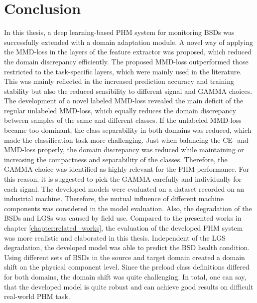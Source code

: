 \chapter{Conclusion}\label{chapter:conclusion}

In this thesis, a deep learning-based PHM system for monitoring BSDs was successfully extended with a domain adaptation module. A novel way of applying the MMD-loss in the layers of the feature extractor was proposed, which reduced the domain discrepancy efficiently. The proposed MMD-loss outperformed those restricted to the task-specific layers, which were mainly used in the literature. This was mainly reflected in the increased prediction accuracy and training stability but also the reduced sensibility to different signal and GAMMA choices. The development of a novel labeled MMD-loss revealed the main deficit of the regular unlabeled MMD-loss, which equally reduces the domain discrepancy between samples of the same and different classes. If the unlabeled MMD-loss became too dominant, the class separability in both domains was reduced, which made the classification task more challenging. Just when balancing the CE- and MMD-loss properly, the domain discrepancy was reduced while maintaining or increasing the compactness and separability of the classes. Therefore, the GAMMA choice was identified as highly relevant for the PHM performance. For this reason, it is suggested to pick the GAMMA carefully and individually for each signal. The developed models were evaluated on a dataset recorded on an industrial machine. Therefore, the mutual influence of different machine components was considered in the model evaluation. Also, the degradation of the BSDs and LGSs was caused by field use. Compared to the presented works in chapter \ref{chapter:related_works}, the evaluation of the developed PHM system was more realistic and elaborated in this thesis. Independent of the LGS degradation, the developed model was able to predict the BSD health condition. Using different sets of BSDs in the source and target domain created a domain shift on the physical component level. Since the preload class definitions differed for both domains, the domain shift was quite challenging. In total, one can say, that the developed model is quite robust and can achieve good results on difficult real-world PHM task.